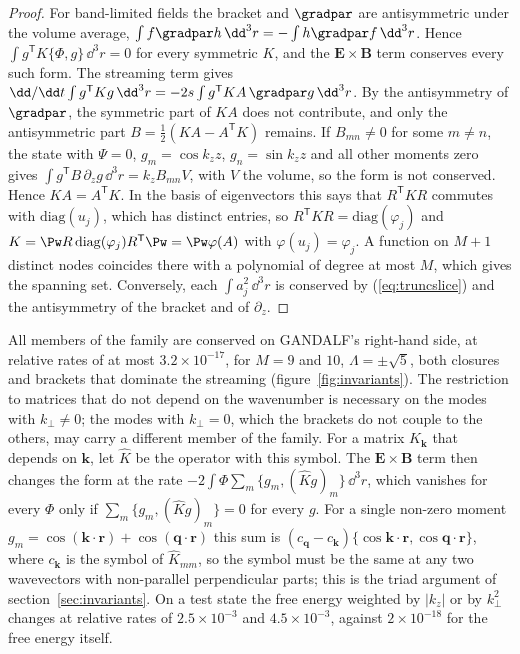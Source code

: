 \begin{proof}
For band-limited fields the bracket and $\gradpar$ are antisymmetric under the volume average, $\int f\gradpar h\,\dd^3r=-\int h\gradpar f\,\dd^3r$. Hence $\int g^{\mathsf T}K\{\Phi,g\}\,\dd^3r=0$ for every symmetric $K$, and the $\boldsymbol E\times\boldsymbol B$ term conserves every such form. The streaming term gives $\dd/\dd t\int g^{\mathsf T}Kg\,\dd^3r=-2s\int g^{\mathsf T}KA\,\gradpar g\,\dd^3r$. By the antisymmetry of $\gradpar$, the symmetric part of $KA$ does not contribute, and only the antisymmetric part $B=\frac12(KA-A^{\mathsf T}K)$ remains. If $B_{mn}\neq0$ for some $m\neq n$, the state with $\Psi=0$, $g_m=\cos k_zz$, $g_n=\sin k_zz$ and all other moments zero gives $\int g^{\mathsf T}B\,\partial_zg\,\dd^3r=k_zB_{mn}V$, with $V$ the volume, so the form is not conserved. Hence $KA=A^{\mathsf T}K$. In the basis of eigenvectors this says that $R^{\mathsf T}KR$ commutes with $\mathrm{diag}(u_j)$, which has distinct entries, so $R^{\mathsf T}KR=\mathrm{diag}(\varphi_j)$ and $K=\Pw R\,\mathrm{diag}(\varphi_j)R^{\mathsf T}\Pw=\Pw\varphi(A)$ with $\varphi(u_j)=\varphi_j$. A function on $M+1$ distinct nodes coincides there with a polynomial of degree at most $M$, which gives the spanning set. Conversely, each $\int a_j^2\,\dd^3r$ is conserved by (\ref{eq:truncslice}) and the antisymmetry of the bracket and of $\partial_z$.
\end{proof}

All members of the family are conserved on GANDALF's right-hand side, at relative rates of at most $3.2\times10^{-17}$, for $M=9$ and $10$, $\Lambda=\pm\sqrt5$, both closures and brackets that dominate the streaming (figure~\ref{fig:invariants}). The restriction to matrices that do not depend on the wavenumber is necessary on the modes with $k_\perp\neq0$; the modes with $k_\perp=0$, which the brackets do not couple to the others, may carry a different member of the family. For a matrix $K_{\boldsymbol k}$ that depends on $\boldsymbol k$, let $\hat K$ be the operator with this symbol. The $\boldsymbol E\times\boldsymbol B$ term then changes the form at the rate $-2\int\Phi\sum_m\{g_m,(\hat Kg)_m\}\,\dd^3r$, which vanishes for every $\Phi$ only if $\sum_m\{g_m,(\hat Kg)_m\}=0$ for every $g$. For a single non-zero moment $g_m=\cos(\boldsymbol k\cdot\boldsymbol r)+\cos(\boldsymbol q\cdot\boldsymbol r)$ this sum is $(c_{\boldsymbol q}-c_{\boldsymbol k})\{\cos\boldsymbol k\cdot\boldsymbol r,\cos\boldsymbol q\cdot\boldsymbol r\}$, where $c_{\boldsymbol k}$ is the symbol of $\hat K_{mm}$, so the symbol must be the same at any two wavevectors with non-parallel perpendicular parts; this is the triad argument of section~\ref{sec:invariants}. On a test state the free energy weighted by $|k_z|$ or by $k_\perp^2$ changes at relative rates of $2.5\times10^{-3}$ and $4.5\times10^{-3}$, against $2\times10^{-18}$ for the free energy itself.

